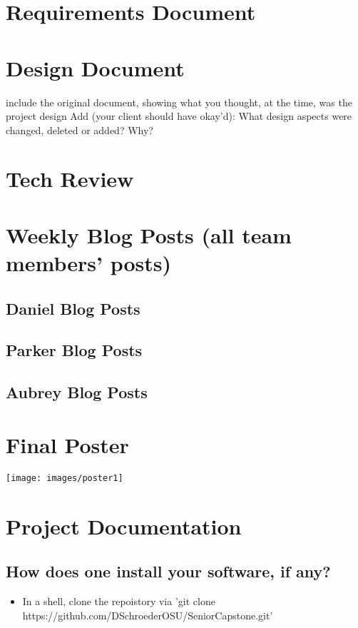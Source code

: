 \documentclass[journal,10pt,onecolumn,compsoc]{IEEEtran}
\begin{document}
    \section{Requirements Document}
    
    
    \section{Design Document}
    
    include the original document, showing what you thought, at the time, was the project design
    Add (your client should have okay'd): What design aspects were changed, deleted or added? Why? 
    \section{Tech Review}
    
	
	
    \section{Weekly Blog Posts (all team members' posts)}
    \subsection{Daniel Blog Posts}
    
	\subsection{Parker Blog Posts}
	
	\subsection{Aubrey Blog Posts}
	
    \section{Final Poster}
    \texttt{[image: images/poster1]} 
    \section{Project Documentation}
    \subsection{How does one install your software, if any?}
    \begin{itemize}
        \item In a shell, clone the repoistory via 'git clone https://github.com/DSchroederOSU/SeniorCapstone.git'
    \end{itemize}
\end{document}
